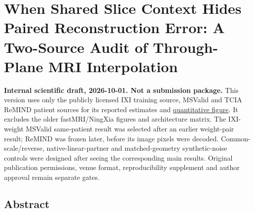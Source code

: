 \documentclass[
]{article}
\author{}
\date{}
\begin{document}
\setlength{\parskip}{3pt plus 1pt minus 1pt}

\section{When Shared Slice Context Hides Paired Reconstruction Error: A
Two-Source Audit of Through-Plane MRI
Interpolation}\label{when-shared-slice-context-hides-paired-reconstruction-error-a-two-source-audit-of-through-plane-mri-interpolation}

\textbf{Internal scientific draft, 2026-10-01. Not a submission
package.} This version uses only the publicly licensed IXI training
source, MSValid and TCIA ReMIND patient sources for its reported
estimates and
\href{figures/PUBLIC_TWO_SOURCE_FIGURE_NOTE_2026-10-01.md}{quantitative
figure}. It excludes the older fastMRI/NingXia figures and architecture
matrix. The IXI-weight MSValid same-patient result was selected after an
earlier weight-pair result; ReMIND was frozen later, before its image
pixels were decoded. Common-scale/reverse, native-linear-partner and
matched-geometry synthetic-noise controls were designed after seeing the
corresponding main results. Original publication permissions, venue
format, reproducibility supplement and author approval remain separate
gates.

\subsection{Abstract}\label{abstract}
\end{document}
